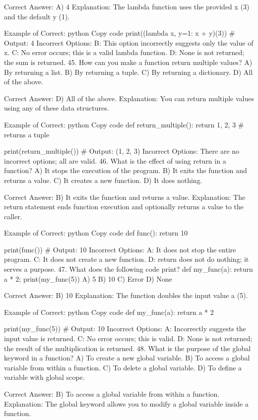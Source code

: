 Correct Answer: A) 4
Explanation: The lambda function uses the provided x (3) and the default y (1).

Example of Correct:
python
Copy code
print((lambda x, y=1: x + y)(3))  # Output: 4
Incorrect Options:
B: This option incorrectly suggests only the value of x.
C: No error occurs; this is a valid lambda function.
D: None is not returned; the sum is returned.
45. How can you make a function return multiple values?
A) By returning a list.
B) By returning a tuple.
C) By returning a dictionary.
D) All of the above.

Correct Answer: D) All of the above.
Explanation: You can return multiple values using any of these data structures.

Example of Correct:
python
Copy code
def return_multiple():
    return 1, 2, 3  # returns a tuple

print(return_multiple())  # Output: (1, 2, 3)
Incorrect Options: There are no incorrect options; all are valid.
46. What is the effect of using return in a function?
A) It stops the execution of the program.
B) It exits the function and returns a value.
C) It creates a new function.
D) It does nothing.

Correct Answer: B) It exits the function and returns a value.
Explanation: The return statement ends function execution and optionally returns a value to the caller.

Example of Correct:
python
Copy code
def func():
    return 10

print(func())  # Output: 10
Incorrect Options:
A: It does not stop the entire program.
C: It does not create a new function.
D: return does not do nothing; it serves a purpose.
47. What does the following code print? def my_func(a): return a * 2; print(my_func(5))
A) 5
B) 10
C) Error
D) None

Correct Answer: B) 10
Explanation: The function doubles the input value a (5).

Example of Correct:
python
Copy code
def my_func(a):
    return a * 2

print(my_func(5))  # Output: 10
Incorrect Options:
A: Incorrectly suggests the input value is returned.
C: No error occurs; this is valid.
D: None is not returned; the result of the multiplication is returned.
48. What is the purpose of the global keyword in a function?
A) To create a new global variable.
B) To access a global variable from within a function.
C) To delete a global variable.
D) To define a variable with global scope.

Correct Answer: B) To access a global variable from within a function.
Explanation: The global keyword allows you to modify a global variable inside a function.

